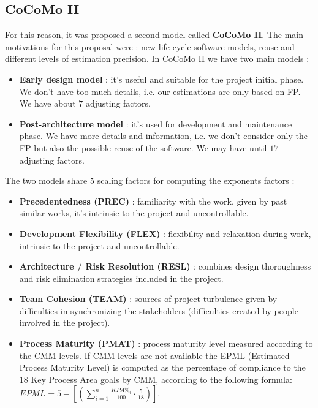 \documentclass[11pt]{article}
\begin{document}
\subsection{CoCoMo II}
For this reason, it was proposed a second model called \textbf{CoCoMo II}. The main motivations for this proposal were : new life cycle software models, reuse and different levels of estimation precision.  In CoCoMo II we have two main models :
\begin{itemize}
\item \textbf{Early design model} : it's useful and suitable for the project initial phase. We don't have too much details, i.e. our estimations are only based on FP. We have about $7$ adjusting factors.
\item \textbf{Post-architecture model} : it's used for development and maintenance phase. We have more details and information, i.e. we don't consider only the FP but also the possible reuse of the software. We may have until $17$ adjusting factors.
\end{itemize}
The two models share $5$ scaling factors for computing the exponents factors :
\begin{itemize}
\item \textbf{Precedentedness (PREC)} : familiarity with the work, given by past similar
works, it’s intrinsic to the project and uncontrollable. 
\item \textbf{Development Flexibility (FLEX)} : flexibility and relaxation during work, intrinsic to the project and uncontrollable.
\item \textbf{Architecture / Risk Resolution (RESL)} : combines design thoroughness and risk elimination strategies included in the project.
\item \textbf{Team Cohesion (TEAM)} : sources of project turbulence given by difficulties
in synchronizing the stakeholders (difficulties created by people involved in the project).
\item \textbf{Process Maturity (PMAT)} : process maturity level measured according to the CMM-levels. If CMM-levels are not available the EPML (Estimated Process Maturity Level) is computed as the percentage of compliance to the 18 Key Process Area goals by CMM, according to the following formula: $EPML = 5 - [( \sum_{i=1}^{n} \frac{KPA\%_i}{100} \cdot \frac{5}{18})]$.
\end{itemize}
\end{document}
